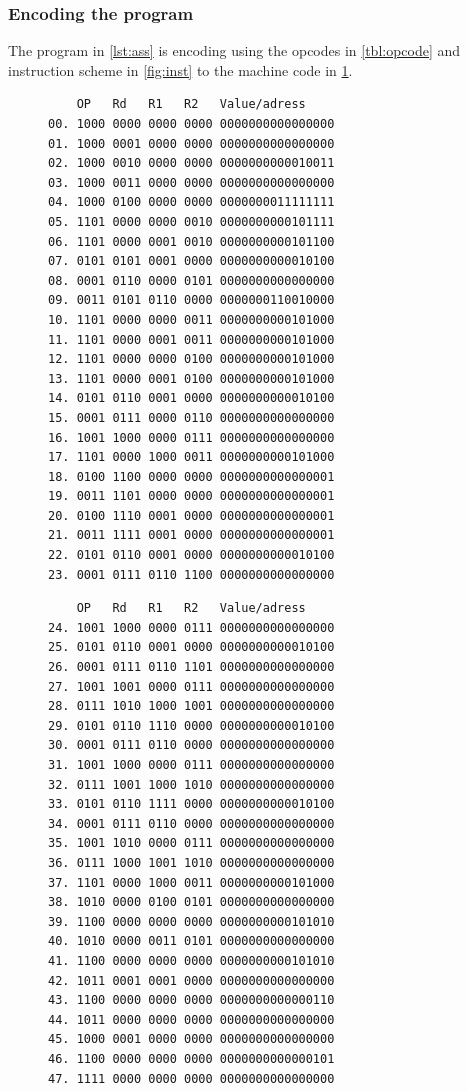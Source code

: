 \documentclass[a4paper, english]{article}
\numberwithin{equation}{section}
\begin{document}
\subsubsection{Encoding the program}
The program in \cref{lst:ass} is encoding using the opcodes in \cref{tbl:opcode} and instruction scheme in \cref{fig:inst} to the machine code in \cref{lst:machine}.
\begin{figure}
    \label{lst:machine}
    \begin{minipage}{0.49\textwidth}
        \vspace{1.5em}
        \centering
        \begin{verbatim}
    OP   Rd   R1   R2   Value/adress
00. 1000 0000 0000 0000 0000000000000000
01. 1000 0001 0000 0000 0000000000000000
02. 1000 0010 0000 0000 0000000000010011
03. 1000 0011 0000 0000 0000000000000000
04. 1000 0100 0000 0000 0000000011111111
05. 1101 0000 0000 0010 0000000000101111
06. 1101 0000 0001 0010 0000000000101100
07. 0101 0101 0001 0000 0000000000010100
08. 0001 0110 0000 0101 0000000000000000
09. 0011 0101 0110 0000 0000000110010000
10. 1101 0000 0000 0011 0000000000101000
11. 1101 0000 0001 0011 0000000000101000
12. 1101 0000 0000 0100 0000000000101000
13. 1101 0000 0001 0100 0000000000101000
14. 0101 0110 0001 0000 0000000000010100
15. 0001 0111 0000 0110 0000000000000000
16. 1001 1000 0000 0111 0000000000000000
17. 1101 0000 1000 0011 0000000000101000
18. 0100 1100 0000 0000 0000000000000001
19. 0011 1101 0000 0000 0000000000000001
20. 0100 1110 0001 0000 0000000000000001
21. 0011 1111 0001 0000 0000000000000001
22. 0101 0110 0001 0000 0000000000010100
23. 0001 0111 0110 1100 0000000000000000
    \end{verbatim}
    \end{minipage}
    \begin{minipage}{0.49\textwidth}
        \vspace{1.5em}
        \centering
        \begin{verbatim}
    OP   Rd   R1   R2   Value/adress
24. 1001 1000 0000 0111 0000000000000000
25. 0101 0110 0001 0000 0000000000010100
26. 0001 0111 0110 1101 0000000000000000
27. 1001 1001 0000 0111 0000000000000000
28. 0111 1010 1000 1001 0000000000000000
29. 0101 0110 1110 0000 0000000000010100
30. 0001 0111 0110 0000 0000000000000000
31. 1001 1000 0000 0111 0000000000000000
32. 0111 1001 1000 1010 0000000000000000
33. 0101 0110 1111 0000 0000000000010100
34. 0001 0111 0110 0000 0000000000000000
35. 1001 1010 0000 0111 0000000000000000
36. 0111 1000 1001 1010 0000000000000000
37. 1101 0000 1000 0011 0000000000101000
38. 1010 0000 0100 0101 0000000000000000
39. 1100 0000 0000 0000 0000000000101010
40. 1010 0000 0011 0101 0000000000000000
41. 1100 0000 0000 0000 0000000000101010
42. 1011 0001 0001 0000 0000000000000000
43. 1100 0000 0000 0000 0000000000000110
44. 1011 0000 0000 0000 0000000000000000
45. 1000 0001 0000 0000 0000000000000000
46. 1100 0000 0000 0000 0000000000000101
47. 1111 0000 0000 0000 0000000000000000
     \end{verbatim}
    \end{minipage}
\end{figure}
\end{document}
